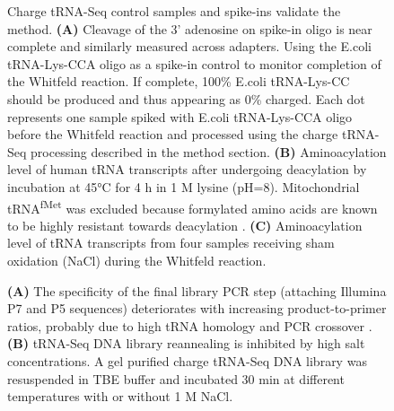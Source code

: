 \begin{figure}[ht]
    \centering
    \caption[Sequenced controls.]{
    Charge tRNA-Seq control samples and spike-ins validate the method.
    \textbf{(A)} Cleavage of the 3’ adenosine on spike-in oligo is near complete and similarly measured across adapters.
    Using the E.coli tRNA-Lys-CCA oligo as a spike-in control to monitor completion of the Whitfeld reaction.
    If complete, 100\% E.coli tRNA-Lys-CC should be produced and thus appearing as 0\% charged.
    Each dot represents one sample spiked with E.coli tRNA-Lys-CCA oligo before the Whitfeld reaction and processed using the charge tRNA-Seq processing described in the method section.
    \textbf{(B)} Aminoacylation level of human tRNA transcripts after undergoing deacylation by incubation at 45°C for 4 h in 1 M lysine (pH=8).
    Mitochondrial tRNA\textsuperscript{fMet} was excluded because formylated amino acids are known to be highly resistant towards deacylation \cite{Schofield1968-qn}.
    \textbf{(C)} Aminoacylation level of tRNA transcripts from four samples receiving sham oxidation (NaCl) during the Whitfeld reaction.
    }
    \label{ch5:figsupp:f2S7}
\end{figure}


\begin{figure}[ht]
    \centering
    \caption[tRNA homology requires careful PCR conditions.]{
    \textbf{(A)} The specificity of the final library PCR step (attaching Illumina P7 and P5 sequences) deteriorates with increasing product-to-primer ratios, probably due to high tRNA homology and PCR crossover \cite{Holcomb2014-vz}.
    \textbf{(B)} tRNA-Seq DNA library reannealing is inhibited by high salt concentrations.
    A gel purified charge tRNA-Seq DNA library was resuspended in TBE buffer and incubated 30 min at different temperatures with or without 1 M NaCl.
    }
    \label{ch5:figsupp:f2S8}
\end{figure}


